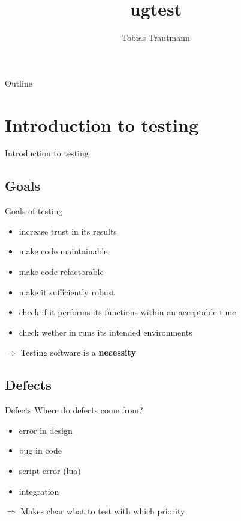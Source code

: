 \documentclass{beamer}
\title[ugtest]{ugtest}
\author{Tobias Trautmann}
\institute{GCSC}
\newcommand{\sectiontitle}[1]{
    \section{#1}
    \begin{frame}
        \centering
        \Huge{#1}
    \end{frame}
}
\begin{document}
    \begin{frame}
        \titlepage
    \end{frame}

    \begin{frame}{Outline}
        \tableofcontents
    \end{frame}

    \sectiontitle{Introduction to testing}
        \subsection{Goals}
        \begin{frame}{Goals of testing}
           \begin{itemize}
                \item increase trust in its results\pause
                \item make code maintainable\pause
                \item make code refactorable\pause
                \item make it sufficiently robust\pause
                \item check if it performs its functions within an acceptable time\pause
                \item check wether in runs its intended environments\pause
           \end{itemize}
           \Large{$\Rightarrow$ Testing software is a \textbf{necessity}}
        \end{frame}

        \subsection{Defects}
        \begin{frame}{Defects}
            Where do defects come from?\\
            \begin{itemize}
                \item error in design
                \item bug in code
                \item script error (lua)
                \item integration
            \end{itemize}
            $\Rightarrow$ Makes clear what to test with which priority

        \end{frame}
        
\end{document}
